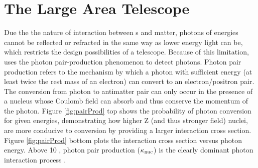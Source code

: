 \section{\label{FGST:LAT}The Large Area Telescope}
Due the the nature of interaction between \gam{}s and matter, photons of \gam{} energies cannot be reflected or refracted in the same way as lower energy light can be, which restricts the design possibilities of a \gam{} telescope. Because of this limitation, \Fermi{} uses the photon pair-production phenomenon to detect \gam{} photons. Photon pair production refers to the mechanism by which a
photon with sufficient energy (at least twice the rest mass of an electron) can convert to an electron/positron pair. The conversion from photon to antimatter pair can only occur in the presence of a nucleus whose Coulomb field can absorb and thus conserve the momentum of the photon. Figure \ref{fig:pairProd} top shows the probability of photon conversion for given energies, demonstrating how higher Z (and thus stronger field) nuclei, are more conducive to conversion by providing a larger interaction cross section. Figure \ref{fig:pairProd} bottom plots the interaction cross section versus photon energy. Above 10 \mev{}, photon pair production (${\rm \kappa_{nuc}}$) is the clearly dominant photon interaction process \cite{Beringer12}.

